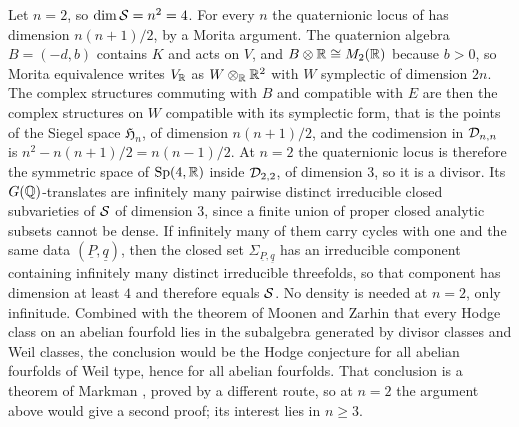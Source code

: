 \begin{remark}[The case $n=2$]\label{rem:ntwo}
Let $n=2$, so $\dim\mathcal{S}=n^{2}=4$. For every $n$ the quaternionic locus of
 has dimension $n(n+1)/2$, by a Morita argument. The
quaternion algebra $B=(-d,b)$ contains $K$ and acts on $V$, and
$B\otimes\mathbb{R}\cong M_{2}(\mathbb{R})$ because $b>0$, so Morita equivalence writes
$V_{\mathbb{R}}$ as $W\otimes_{\mathbb{R}}\mathbb{R}^{2}$ with $W$ symplectic of dimension $2n$.
The complex structures commuting with $B$ and compatible with $E$ are then
the complex structures on $W$ compatible with its symplectic form, that is the
points of the Siegel
space $\mathfrak{H}_{n}$, of dimension $n(n+1)/2$, and the codimension in
$\mathcal{D}_{n,n}$ is $n^{2}-n(n+1)/2=n(n-1)/2$. At
$n=2$ the quaternionic locus is therefore the symmetric space of
$\operatorname{Sp}(4,\mathbb{R})$ inside $\mathcal{D}_{2,2}$, of dimension $3$, so it is a divisor. Its
$G(\mathbb{Q})$-translates are infinitely many
pairwise distinct irreducible closed subvarieties of $\mathcal{S}$ of dimension $3$,
since a finite union of proper closed analytic subsets cannot be dense. If
infinitely many of them carry cycles with one and the same data
$(\underline{P},\underline{q})$, then the closed set
$\Sigma_{\underline{P},\underline{q}}$ has an irreducible component containing
infinitely many distinct irreducible threefolds, so that component has
dimension at least $4$ and therefore equals $\mathcal{S}$. No density is needed at
$n=2$, only infinitude. Combined with the theorem of Moonen and Zarhin
\cite{MZ99} that every Hodge class on an abelian fourfold lies in the
subalgebra generated by divisor classes and Weil classes, the conclusion would
be the Hodge conjecture for all abelian fourfolds of Weil type, hence for all
abelian fourfolds. That conclusion is a theorem of Markman
\cite[Corollary~1.6.1]{Mar25a}, proved by a different route, so at $n=2$ the
argument above would give a second proof; its interest lies in $n\ge3$.
\end{remark}
